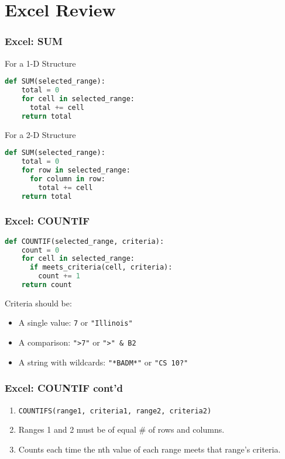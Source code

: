 \documentclass{beamer}
\begin{document}
\section{Excel Review}
%
%
\begin{frame}[fragile]
  \frametitle{Excel: SUM}
  For a 1-D Structure
  \begin{lstlisting}[language=Python, autogobble]
  def SUM(selected_range):
    total = 0
    for cell in selected_range:
      total += cell
    return total
  \end{lstlisting}
  \vfill
  For a 2-D Structure 
  \begin{lstlisting}[language=Python, autogobble]
  def SUM(selected_range):
    total = 0
    for row in selected_range:
      for column in row:
        total += cell
    return total
  \end{lstlisting}
\end{frame}


%
%
\begin{frame}[fragile]
  \frametitle{Excel: COUNTIF}
  \begin{lstlisting}[language=Python, autogobble]
  def COUNTIF(selected_range, criteria):
    count = 0
    for cell in selected_range:
      if meets_criteria(cell, criteria):
        count += 1
    return count
  \end{lstlisting}
  \vfill
  Criteria should be:
  \begin{itemize}
    \item A single value: \lstinline|7| or \lstinline|"Illinois"|
    \item A comparison: \lstinline|">7"| or \lstinline|">" & B2|
    \item A string with wildcards: \lstinline|"*BADM*"| or \lstinline|"CS 10?"|
  \end{itemize}
\end{frame}


%
%
%
\begin{frame}[fragile]
  \frametitle{Excel: COUNTIF cont'd}
  \begin{enumerate}[A]
    \item \lstinline|COUNTIFS(range1, criteria1, range2, criteria2)|
    \item Ranges 1 and 2 must be of equal \# of rows and columns.
    \item Counts each time the nth value of each range meets that range's criteria.
  \end{enumerate}
\end{frame}
\end{document}
